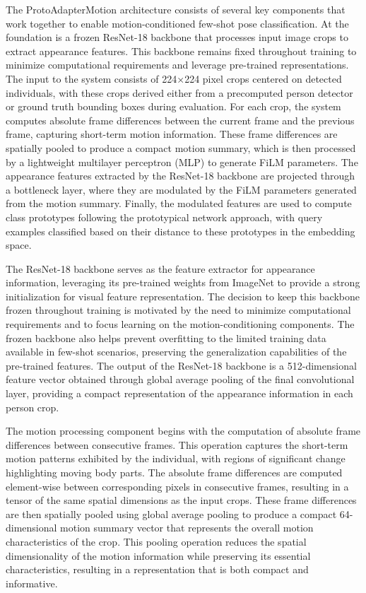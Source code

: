 \documentclass[11pt]{article}
\begin{document}
The ProtoAdapterMotion architecture consists of several key components that work together to enable motion-conditioned few-shot pose classification. At the foundation is a frozen ResNet-18 backbone that processes input image crops to extract appearance features. This backbone remains fixed throughout training to minimize computational requirements and leverage pre-trained representations. The input to the system consists of 224×224 pixel crops centered on detected individuals, with these crops derived either from a precomputed person detector or ground truth bounding boxes during evaluation. For each crop, the system computes absolute frame differences between the current frame and the previous frame, capturing short-term motion information. These frame differences are spatially pooled to produce a compact motion summary, which is then processed by a lightweight multilayer perceptron (MLP) to generate FiLM parameters. The appearance features extracted by the ResNet-18 backbone are projected through a bottleneck layer, where they are modulated by the FiLM parameters generated from the motion summary. Finally, the modulated features are used to compute class prototypes following the prototypical network approach, with query examples classified based on their distance to these prototypes in the embedding space.

The ResNet-18 backbone serves as the feature extractor for appearance information, leveraging its pre-trained weights from ImageNet to provide a strong initialization for visual feature representation. The decision to keep this backbone frozen throughout training is motivated by the need to minimize computational requirements and to focus learning on the motion-conditioning components. The frozen backbone also helps prevent overfitting to the limited training data available in few-shot scenarios, preserving the generalization capabilities of the pre-trained features. The output of the ResNet-18 backbone is a 512-dimensional feature vector obtained through global average pooling of the final convolutional layer, providing a compact representation of the appearance information in each person crop.

The motion processing component begins with the computation of absolute frame differences between consecutive frames. This operation captures the short-term motion patterns exhibited by the individual, with regions of significant change highlighting moving body parts. The absolute frame differences are computed element-wise between corresponding pixels in consecutive frames, resulting in a tensor of the same spatial dimensions as the input crops. These frame differences are then spatially pooled using global average pooling to produce a compact 64-dimensional motion summary vector that represents the overall motion characteristics of the crop. This pooling operation reduces the spatial dimensionality of the motion information while preserving its essential characteristics, resulting in a representation that is both compact and informative.
\end{document}
